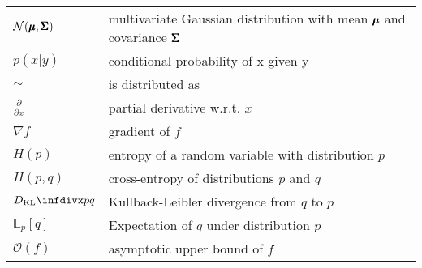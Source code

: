 \begin{tabular}[h]{@{} p{} p{} @{}}
$\mathcal{N}(\pmb{\mu}, \pmb{\Sigma})$  & multivariate Gaussian distribution with mean $\pmb{\mu}$ and covariance $\pmb{\Sigma}$ \\
$p(x \vert y)$                & conditional probability of x given y \\
$\sim$                        & is distributed as \\
$\frac{\partial}{\partial x}$ & partial derivative w.r.t. $x$ \\
$\nabla f$                    & gradient of $f$ \\
$H(p)$                        & entropy of a random variable with distribution $p$ \\
$H(p,q)$                      & cross-entropy of distributions $p$ and $q$ \\
$\dkl{p}{q}$                  & Kullback-Leibler divergence from $q$ to $p$ \\
$\mathbb{E}_{p}[q]$           & Expectation of $q$ under distribution $p$ \\
$\mathcal{O}(f)$              & asymptotic upper bound of $f$ \\
\end{tabular}
